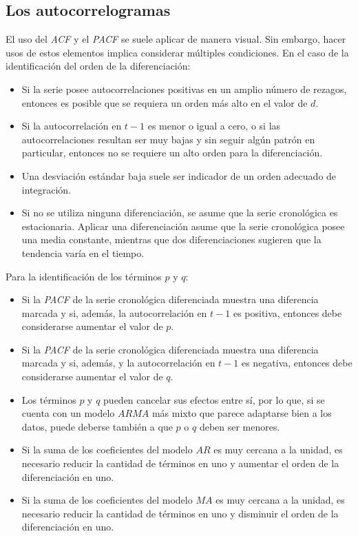 \documentclass[
]{article}
\providecommand{\tightlist}{%
  \setlength{\itemsep}{0pt}\setlength{\parskip}{0pt}}
\begin{document}
\subsection{Los autocorrelogramas}

El uso del \emph{ACF} y el \emph{PACF} se suele aplicar de manera
visual. Sin embargo, hacer usos de estos elementos implica considerar
múltiples condiciones. En el caso de la identificación del orden de la
diferenciación:

\begin{itemize}
\tightlist
\item
  Si la serie posee autocorrelaciones positivas en un amplio número de
  rezagos, entonces es posible que se requiera un orden más alto en el
  valor de \(d\).
\item
  Si la autocorrelación en \(t-1\) es menor o igual a cero, o si las
  autocorrelaciones resultan ser muy bajas y sin seguir algún patrón en
  particular, entonces no se requiere un alto orden para la
  diferenciación.
\item
  Una desviación estándar baja suele ser indicador de un orden adecuado
  de integración.
\item
  Si no se utiliza ninguna diferenciación, se asume que la serie
  cronológica es estacionaria. Aplicar una diferenciación asume que la
  serie cronológica posee una media constante, mientras que dos
  diferenciaciones sugieren que la tendencia varía en el tiempo.
\end{itemize}

Para la identificación de los términos \(p\) y \(q\):

\begin{itemize}
\tightlist
\item
  Si la \emph{PACF} de la serie cronológica diferenciada muestra una
  diferencia marcada y si, además, la autocorrelación en \(t-1\) es
  positiva, entonces debe considerarse aumentar el valor de \(p\).
\item
  Si la \emph{PACF} de la serie cronológica diferenciada muestra una
  diferencia marcada y si, además, y la autocorrelación en \(t-1\) es
  negativa, entonces debe considerarse aumentar el valor de \(q\).
\item
  Los términos \(p\) y \(q\) pueden cancelar sus efectos entre sí, por
  lo que, si se cuenta con un modelo \(ARMA\) más mixto que parece
  adaptarse bien a los datos, puede deberse también a que \(p\) o \(q\)
  deben ser menores.
\item
  Si la suma de los coeficientes del modelo \(AR\) es muy cercana a la
  unidad, es necesario reducir la cantidad de términos en uno y aumentar
  el orden de la diferenciación en uno.
\item
  Si la suma de los coeficientes del modelo \(MA\) es muy cercana a la
  unidad, es necesario reducir la cantidad de términos en uno y
  disminuir el orden de la diferenciación en uno.
\end{itemize}
\end{document}
